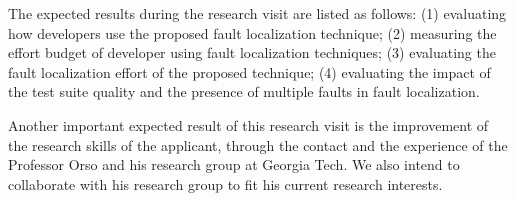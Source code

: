 \documentclass[12pt,a4paper,espaco=umemeio,noindentfirst,oneside,openany,tocpage=plain,pnumromarab,ruledheader,time,anapcustomindent]{sty/abnt}
\begin{document}
The expected results during the research visit are listed as follows: (1) evaluating how developers use the proposed fault localization technique; 
(2) measuring the effort budget of developer using fault localization techniques; (3) evaluating the fault localization effort of the proposed 
technique; (4) evaluating the impact of the test suite quality and the presence of multiple faults in fault localization.

Another important expected result of this research visit is the improvement of the research skills of the applicant, through the contact and 
the experience of the Professor Orso and his research group at Georgia Tech. We also intend to collaborate with his research group to fit his current 
research interests.





\end{document}
